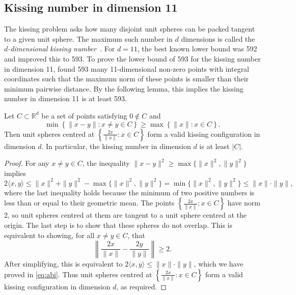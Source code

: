 \subsection{Kissing number in dimension 11}
The kissing problem asks how many disjoint unit spheres can be packed tangent to a given unit sphere. The maximum such number in $d$ dimensions is called the \emph{$d$-dimensional kissing number~\citep{kissing_survey}}.
For $d=11$, the best known lower bound was 592~\citep{kissing_11} and \method improved this to 593. To prove the lower bound of 593 for the kissing number in dimension 11, \method found 593 many 11-dimensional non-zero points with integral coordinates such that  
the maximum norm of these points is smaller than their minimum pairwise distance.
By the following lemma, this implies the kissing number in dimension 11 is at least 593.

\begin{lemma}
Let $C \subset \mathbb{R}^d$ be a set of points satisfying
$0 \notin C$ and 
\begin{equation*}
    \min \left\{ \|x-y\| : x \neq y \in C \right\} \ge \max \left\{ \|x\|: x \in C \right\}.
\end{equation*}
Then unit spheres centred at $\left\{  \frac{2x}{\|x\|}:{x\in C}\right\}$ form a valid kissing configuration in dimension $d$. In particular, the kissing number in dimension $d$ is at least $|C|$.
\end{lemma}

\begin{proof}
For any $x\neq y \in C$, the inequality $\|x - y\|^2 \geq \max \{\|x\|^2, \|y\|^2\}$ implies
\begin{equation}
2 \langle x, y \rangle \leq \|x\|^2 + \|y\|^2 - \max \{\|x\|^2, \|y\|^2\} = \min \{\|x\|^2, \|y\|^2\} \leq \|x\|\cdot\|y\|,
\label{eq:abi}
\end{equation}
where the last inequality holds because the minimum of two positive numbers is less than or equal to their geometric mean.
The points $\left\{ \frac{2x}{\|x\|}:{x\in C}\right\}$ have norm 2, so unit spheres centred at them are tangent to a unit sphere centred at the origin.
The last step is to show that these spheres do not overlap. This is equivalent to showing, for all $x\neq y \in C$, that
\[
\left\| \frac{2x}{\|x\|} -  \frac{2y}{\|y\|}\right\| \geq 2.
\]
After simplifying, this is equivalent to
\(
2 \langle x, y \rangle  \leq \|x\|\cdot\|y\|\),
which we have proved in \eqref{eq:abi}.
Thus unit spheres centred at $\left\{ \frac{2x}{\|x\|}:{x\in C}\right\}$ form a valid kissing configuration in dimension $d$, as required.
\end{proof}


